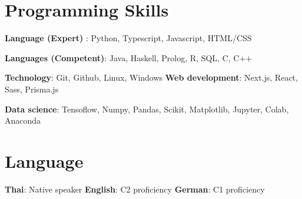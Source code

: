 %
\section{Programming Skills}
\resumeSubHeadingListStart
\item{
            \textbf{Language (Expert) }{: Python, Typescript, Javascript, HTML/CSS}
      }
\item{
            \textbf{Languages (Competent)}{: Java, Haskell, Prolog, R, SQL, C, C++}
      }
\item{
            \textbf{Technology}{: Git, Github, Linux, Windows}
            \hfill
            \textbf{Web development}{: Next.js, React, Sass, Prisma.js}
      }
\item{
            \textbf{Data science}{: Tensoflow, Numpy, Pandas, Scikit, Matplotlib, Jupyter, Colab, Anaconda}
            \hfill
      }
\resumeSubHeadingListEnd
%
\section{Language}
\resumeSubHeadingListStart
\item{
            \textbf{Thai}{: Native speaker}
            \hfill
            \textbf{English}{: C2 proficiency}
            \hfill
            \textbf{German}{: C1 proficiency}
      }
\resumeSubHeadingListEnd